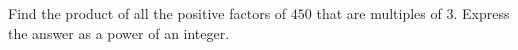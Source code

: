Find the product of all the positive factors of $450$ that are multiples of $3$. Express the answer as a power of an integer.
